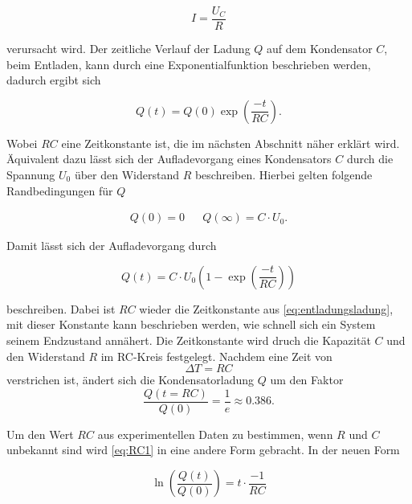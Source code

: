 \begin{equation}
    \label{eq:ohmschesgesetz}
    I = \frac{U_C}{R}
\end{equation}

verursacht wird. 
Der zeitliche Verlauf der Ladung $Q$ auf dem Kondensator $C$, beim Entladen, kann durch eine Exponentialfunktion beschrieben werden, dadurch ergibt sich

\begin{equation}
    \label{eq:entladungsladung}
    Q (t) = Q (0) \exp{\left(\frac{-t}{RC} \right)}.
\end{equation}

Wobei $RC$ eine Zeitkonstante ist, die im nächsten Abschnitt näher erklärt wird. \cite{V353}
Äquivalent dazu lässt sich der Aufladevorgang eines Kondensators $C$ durch die Spannung $U_0$ über den Widerstand $R$ beschreiben. Hierbei gelten folgende Randbedingungen für $Q$

\begin{align}
    \label{eq:ladung}
    Q (0) = 0 && Q (\infty) = C \cdot U_0.
\end{align}

Damit lässt sich der Aufladevorgang durch

\begin{equation}
    \label{eq:aufladungsladung}
    Q (t) = C \cdot U_0  (1- \exp{\left(\frac{-t}{RC} \right)} )
\end{equation}

beschreiben. \cite{V353} Dabei ist $RC$ wieder die Zeitkonstante aus \autoref{eq:entladungsladung}, mit dieser Konstante kann beschrieben werden, wie schnell sich ein System seinem Endzustand annähert. Die Zeitkonstante wird druch die Kapazität $C$ und den Widerstand $R$ im RC-Kreis festgelegt. Nachdem eine Zeit von 
\begin{equation}
    \Delta T = RC
\end{equation} verstrichen ist, ändert sich die Kondensatorladung $Q$ um den Faktor
\begin{equation}
    \label{eq:RC1}
    \frac{Q (t = RC)}{Q (0)} = \frac{1}{e} \approx 0.386.
\end{equation}

Um den Wert $RC$ aus experimentellen Daten zu bestimmen, wenn $R$ und $C$ unbekannt sind wird \autoref{eq:RC1} in eine andere Form gebracht. In der neuen Form

\begin{equation}
    \label{eq:RC2}
    \ln \left( \frac{Q (t)}{Q (0)} \right) = t \cdot \frac{-1}{RC}
\end{equation}

